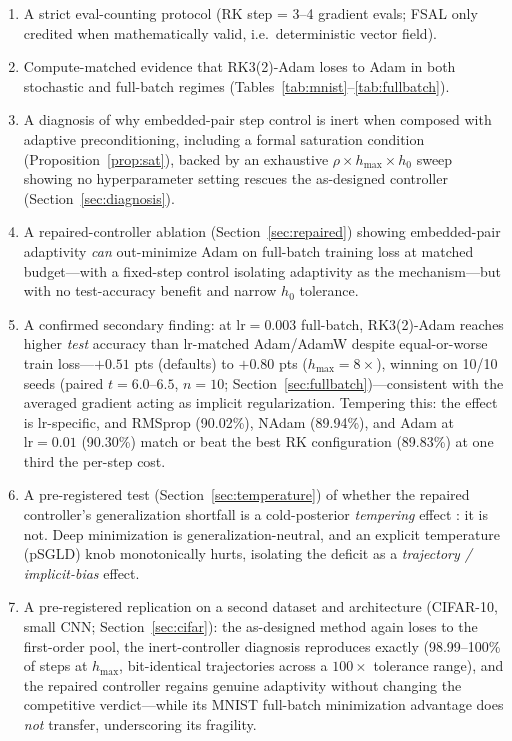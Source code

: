 \documentclass{article}
\newcommand{\hmax}{h_{\max}}
\begin{document}
\begin{enumerate}
\item A strict eval-counting protocol (RK step = 3--4 gradient evals; FSAL only credited when mathematically valid, i.e.\ deterministic vector field).
\item Compute-matched evidence that RK3(2)-Adam loses to Adam in both stochastic and full-batch regimes (Tables~\ref{tab:mnist}--\ref{tab:fullbatch}).
\item A diagnosis of why embedded-pair step control is inert when composed with adaptive preconditioning, including a formal saturation condition (Proposition~\ref{prop:sat}), backed by an exhaustive $\rho \times \hmax \times h_0$ sweep showing no hyperparameter setting rescues the as-designed controller (Section~\ref{sec:diagnosis}).
\item A repaired-controller ablation (Section~\ref{sec:repaired}) showing embedded-pair adaptivity \emph{can} out-minimize Adam on full-batch training loss at matched budget---with a fixed-step control isolating adaptivity as the mechanism---but with no test-accuracy benefit and narrow $h_0$ tolerance.
\item A confirmed secondary finding: at $\mathrm{lr}{=}0.003$ full-batch, RK3(2)-Adam reaches higher \emph{test} accuracy than lr-matched Adam/AdamW despite equal-or-worse train loss---$+0.51$ pts (defaults) to $+0.80$ pts ($\hmax{=}8\times$), winning on 10/10 seeds (paired $t = 6.0$--$6.5$, $n{=}10$; Section~\ref{sec:fullbatch})---consistent with the averaged gradient acting as implicit regularization. Tempering this: the effect is lr-specific, and RMSprop (90.02\%), NAdam (89.94\%), and Adam at $\mathrm{lr}{=}0.01$ (90.30\%) match or beat the best RK configuration (89.83\%) at one third the per-step cost.
\item A pre-registered test (Section~\ref{sec:temperature}) of whether the repaired controller's generalization shortfall is a cold-posterior \emph{tempering} effect \cite{wenzel2020good}: it is not. Deep minimization is generalization-neutral, and an explicit temperature (pSGLD) knob monotonically hurts, isolating the deficit as a \emph{trajectory / implicit-bias} effect.
\item A pre-registered replication on a second dataset and architecture (CIFAR-10, small CNN; Section~\ref{sec:cifar}): the as-designed method again loses to the first-order pool, the inert-controller diagnosis reproduces exactly (98.99--100\% of steps at $\hmax$, bit-identical trajectories across a $100\times$ tolerance range), and the repaired controller regains genuine adaptivity without changing the competitive verdict---while its MNIST full-batch minimization advantage does \emph{not} transfer, underscoring its fragility.
\end{enumerate}
\end{document}
